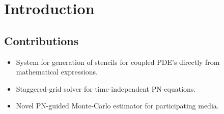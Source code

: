 \section{Introduction}


\subsection*{Contributions}
\begin{itemize}
	\item System for generation of stencils for coupled PDE's directly from mathematical expressions.
	\item Staggered-grid solver for time-independent PN-equations.
	\item Novel PN-guided Monte-Carlo estimator for participating media.
\end{itemize}
